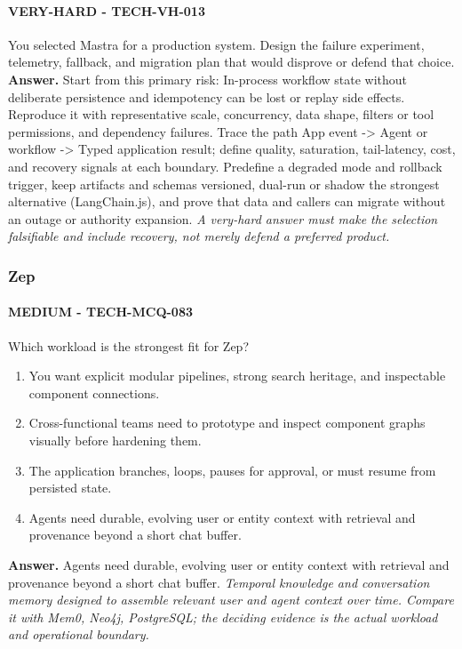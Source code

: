 \paragraph{VERY-HARD - TECH-VH-013} You selected Mastra for a production system. Design the failure experiment, telemetry, fallback, and migration plan that would disprove or defend that choice.
\textbf{Answer.} Start from this primary risk: In-process workflow state without deliberate persistence and idempotency can be lost or replay side effects. Reproduce it with representative scale, concurrency, data shape, filters or tool permissions, and dependency failures. Trace the path App event -> Agent or workflow -> Typed application result; define quality, saturation, tail-latency, cost, and recovery signals at each boundary. Predefine a degraded mode and rollback trigger, keep artifacts and schemas versioned, dual-run or shadow the strongest alternative (LangChain.js), and prove that data and callers can migrate without an outage or authority expansion.
\textit{A very-hard answer must make the selection falsifiable and include recovery, not merely defend a preferred product.}
\subsubsection*{Zep}
\paragraph{MEDIUM - TECH-MCQ-083} Which workload is the strongest fit for Zep?
\begin{enumerate}[label=\Alph*.]
\item You want explicit modular pipelines, strong search heritage, and inspectable component connections.
\item Cross-functional teams need to prototype and inspect component graphs visually before hardening them.
\item The application branches, loops, pauses for approval, or must resume from persisted state.
\item Agents need durable, evolving user or entity context with retrieval and provenance beyond a short chat buffer.
\end{enumerate}
\textbf{Answer.} Agents need durable, evolving user or entity context with retrieval and provenance beyond a short chat buffer.
\textit{Temporal knowledge and conversation memory designed to assemble relevant user and agent context over time. Compare it with Mem0, Neo4j, PostgreSQL; the deciding evidence is the actual workload and operational boundary.}
